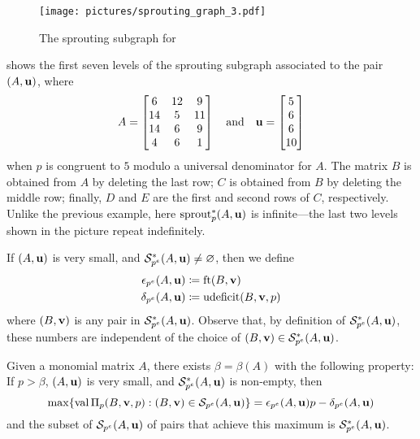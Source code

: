 \documentclass{amsart}
\begin{document}
\begin{example}
   \label{ex: new example}
   \begin{figure}
      \centering
      \texttt{[image: pictures/sprouting\_graph\_3.pdf]}
      \caption{The sprouting subgraph for }
      \label{fig: sprouting graph 2}
   \end{figure}
    shows the first seven levels of the sprouting subgraph associated to the pair $(A,\mathbf{u})$, where
   \[
      A = \begin{bmatrix} 6&12&9 \\ 14&5&11 \\ 14&6&9 \\4&6&1 \end{bmatrix}
      \quad\text{and} \quad
      \mathbf{u} =\begin{bmatrix} 5 \\ 6 \\ 6 \\ 10 \end{bmatrix}
   \]
   when $p$ is congruent to $5$ modulo a universal denominator for $A$.
   The matrix $B$ is obtained from $A$ by deleting the last row;  $C$ is obtained from $B$ by deleting the middle row; finally, $D$ and $E$ are the first and second rows of $C$, respectively.
   Unlike the previous example, here $\operatorname{sprout}^*_p(A,\mathbf{u})$ is infinite---the last two levels shown in the picture repeat indefinitely.
\end{example}

\begin{definition}
   \label{epsilon delta: D}
   If $(A,\mathbf{u})$ is very small, and $\mathcal{S}^{\ast}_{p^e}(A,\mathbf{u}) \neq \varnothing$, then we define
   \begin{align*}
     \epsilon_{p^e}(A,\mathbf{u}) & \coloneqq \operatorname{ft}(B, \mathbf{v}) \\
     \delta_{p^e}(A,\mathbf{u}) & \coloneqq \operatorname{udeficit}(B,\mathbf{v},p)
   \end{align*}
   where $(B,\mathbf{v})$ is any pair in $\mathcal{S}^{\ast}_{p^e}(A,\mathbf{u})$.
   Observe that, by definition of $\mathcal{S}^{\ast}_{p^e}(A,\mathbf{u})$, these numbers are independent of the choice of $(B,\mathbf{v}) \in \mathcal{S}^{\ast}_{p^e}(A,\mathbf{u})$.
\end{definition}

\begin{proposition}
   \label{p large graph: P}
   Given a monomial matrix $A$, there exists $\beta = \beta(A)$ with the following property\textup:
   If $p > \beta$, $(A,\mathbf{u})$ is very small, and $\mathcal{S}_{p^e}^{\ast}(A,\mathbf{u})$ is non-empty, then
   \[
      \max \{ \operatorname{val} \Pi_p(B,\mathbf{v},p) : (B,\mathbf{v}) \in \mathcal{S}_{p^e}(A,\mathbf{u}) \} = \epsilon_{p^e}(A,\mathbf{u}) p-\delta_{p^e}(A,\mathbf{u})
   \]
   and the subset of $\mathcal{S}_{p^e}(A,\mathbf{u})$ of pairs that achieve this maximum is $\mathcal{S}^{\ast}_{p^e}(A,\mathbf{u})$.
\end{proposition}
\end{document}
